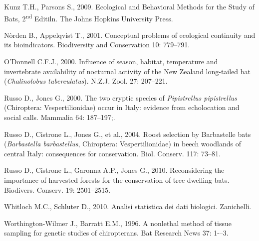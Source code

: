 \begin{multicols}{2}
\begin{small}
Kunz T.H., Parsons S., 2009. Ecological and Behavioral Methods for the Study of Bats, 2\textsuperscript{nd} Editiln. The Johns Hopkins University Press.

Nòrden B., Appelqvist T., 2001. Conceptual problems of ecological continuity and its bioindicators. Biodiversity and Conservation 10: 779--791.

O'Donnell C.F.J., 2000. Influence of season, habitat, temperature and invertebrate availability of nocturnal activity of the New Zealand long-tailed bat (\emph{Chalinolobus tuberculatus}). N.Z.J. Zool. 27: 207--221.

Russo D., Jones G., 2000. The two cryptic species of \emph{Pipistrellus pipistrellus} (Chiroptera: Vespertilionidae) occur in Italy: evidence from echolocation and social calls. Mammalia 64: 187--197;.

Russo D., Cistrone L., Jones G., et al., 2004. Roost selection by Barbastelle bats (\emph{Barbastella barbastellus}, Chiroptera: Vespertilionidae) in beech woodlands of central Italy: consequences for conservation. Biol. Conserv. 117: 73--81.

Russo D., Cistrone L., Garonna A.P., Jones G., 2010. Reconsidering the importance of harvested forests for the conservation of tree-dwelling bats. Biodivers. Conserv. 19: 2501--2515.

Whitloch M.C., Schluter D., 2010. Analisi statistica dei dati biologici. Zanichelli.

Worthington-Wilmer J., Barratt E.M., 1996. A nonlethal method of tissue sampling for genetic studies of chiropterans. Bat Research News 37: 1-–3.

\end{small}

\end{multicols}
